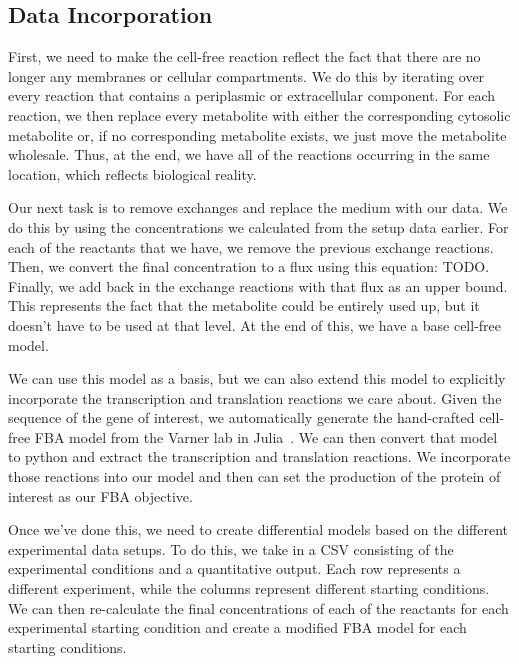 \subsection{Data Incorporation} \label{sec:incorp}
First, we need to make the cell-free reaction reflect the fact that there are no longer any membranes or cellular compartments.
We do this by iterating over every reaction that contains a periplasmic or extracellular component.
For each reaction, we then replace every metabolite with either the corresponding cytosolic metabolite or, if no corresponding metabolite exists, we just move the metabolite wholesale.
Thus, at the end, we have all of the reactions occurring in the same location, which reflects biological reality.

Our next task is to remove exchanges and replace the medium with our data.
We do this by using the concentrations we calculated from the setup data earlier.
For each of the reactants that we have, we remove the previous exchange reactions.
Then, we convert the final concentration to a flux using this equation: TODO.
Finally, we add back in the exchange reactions with that flux as an upper bound.
This represents the fact that the metabolite could be entirely used up, but it doesn't have to be used at that level.
At the end of this, we have a base cell-free model.

We can use this model as a basis, but we can also extend this model to explicitly incorporate the transcription and translation reactions we care about.
Given the sequence of the gene of interest, we automatically generate the hand-crafted cell-free FBA model from the Varner lab in Julia~\cite{vilkhovoy2017sequence}.
We can then convert that model to python and extract the transcription and translation reactions.
We incorporate those reactions into our model and then can set the production of the protein of interest as our FBA objective.

Once we've done this, we need to create differential models based on the different experimental data setups.
To do this, we take in a CSV consisting of the experimental conditions and a quantitative output.
Each row represents a different experiment, while the columns represent different starting conditions.
We can then re-calculate the final concentrations of each of the reactants for each experimental starting condition and create a modified FBA model for each starting conditions.



